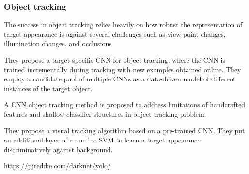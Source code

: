 \begin{frame}
	\frametitle{Object tracking}
	
	
	The success in object tracking relies heavily on how robust the representation of target appearance is against several challenges such as view point changes, illumination changes, and occlusions
	
	\bigskip 
	
	
	
	They propose a target-specific CNN for object tracking, where the CNN is trained incrementally during tracking with new examples obtained online. They employ a candidate pool of multiple CNNs as a data-driven model of different instances of the target object. 
	
	\medskip
	
	
	A CNN object tracking method is proposed to address limitations of handcrafted features and shallow classifier structures in object tracking problem. 
	
	\medskip
	
	
	They propose a visual tracking algorithm based on a pre-trained CNN. They put an additional layer of an online SVM to learn a target appearance discriminatively against background. 
	
	\bigskip 
	
	\url{https://pjreddie.com/darknet/yolo/}
\end{frame}



